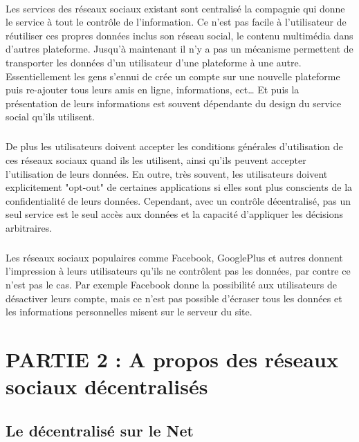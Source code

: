 \paragraph{}
Les services des réseaux sociaux existant sont centralisé la compagnie qui donne le service à tout le contrôle de l'information. Ce n'est pas facile à l'utilisateur de réutiliser ces propres données inclus son réseau social, le contenu multimédia dans d'autres plateforme. Jusqu'à maintenant il n'y a pas un mécanisme permettent de transporter les données d'un utilisateur d'une plateforme à une autre.
Essentiellement les gens s'ennui de crée un compte sur une nouvelle plateforme puis re-ajouter tous leurs amis en ligne, informations, ect… 
Et puis la présentation de leurs informations est souvent dépendante du design du service social qu'ils utilisent.
\subparagraph{}
De plus les utilisateurs doivent accepter les conditions générales d'utilisation de ces réseaux sociaux quand ils les utilisent, ainsi qu'ils peuvent accepter l'utilisation de leurs données. En outre, très souvent, les utilisateurs doivent explicitement "opt-out" de certaines applications si elles sont plus conscients de la confidentialité de leurs données. Cependant, avec un contrôle décentralisé, pas un seul service est le seul accès aux données et la capacité d'appliquer les décisions arbitraires.
\subparagraph{}
Les réseaux sociaux populaires comme Facebook, GooglePlus et autres donnent l'impression à leurs utilisateurs qu'ils ne contrôlent pas les données, par contre ce n'est pas le cas. Par exemple Facebook donne la possibilité aux utilisateurs de désactiver leurs compte, mais ce n'est pas possible d'écraser tous les données et les informations personnelles misent sur le serveur du site.
\newpage
\section{PARTIE 2 : A propos des réseaux sociaux décentralisés}
\subsection{Le décentralisé sur le Net }
